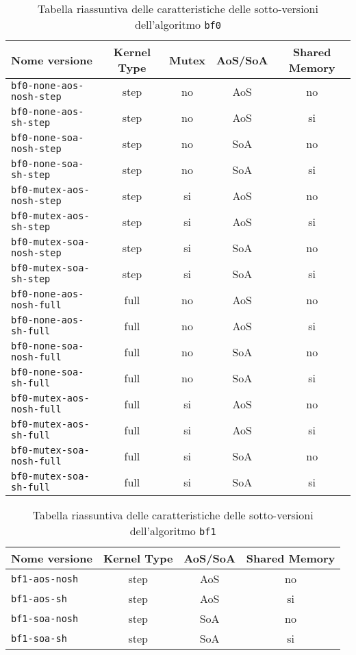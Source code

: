 \documentclass[a4paper]{article}
\begin{document}
	\begin{table}[!ht]
		\centering
		\begin{tabular}{|l|c|c|c|c|}
			\hline
			\textbf{Nome versione} & \textbf{Kernel Type} & \textbf{Mutex} & \textbf{AoS/SoA} & \textbf{Shared Memory} \\ \hline
			\texttt{bf0-none-aos-nosh-step}  & step & no & AoS & no \\ \hline
			\texttt{bf0-none-aos-sh-step}    & step & no & AoS & si \\ \hline
			\texttt{bf0-none-soa-nosh-step}  & step & no & SoA & no \\ \hline
			\texttt{bf0-none-soa-sh-step}    & step & no & SoA & si \\ \hline
			\texttt{bf0-mutex-aos-nosh-step} & step & si & AoS & no \\ \hline
			\texttt{bf0-mutex-aos-sh-step}   & step & si & AoS & si \\ \hline
			\texttt{bf0-mutex-soa-nosh-step} & step & si & SoA & no \\ \hline
			\texttt{bf0-mutex-soa-sh-step}   & step & si & SoA & si \\ \hline
			\texttt{bf0-none-aos-nosh-full}  & full & no & AoS & no \\ \hline
			\texttt{bf0-none-aos-sh-full}    & full & no & AoS & si \\ \hline
			\texttt{bf0-none-soa-nosh-full}  & full & no & SoA & no \\ \hline
			\texttt{bf0-none-soa-sh-full}    & full & no & SoA & si \\ \hline
			\texttt{bf0-mutex-aos-nosh-full} & full & si & AoS & no \\ \hline
			\texttt{bf0-mutex-aos-sh-full}   & full & si & AoS & si \\ \hline
			\texttt{bf0-mutex-soa-nosh-full} & full & si & SoA & no \\ \hline
			\texttt{bf0-mutex-soa-sh-full}   & full & si & SoA & si \\ \hline
		\end{tabular}
		\label{tab:riassunto_bf0}
		\caption{Tabella riassuntiva delle caratteristiche delle sotto-versioni dell'algoritmo \texttt{bf0}}
	\end{table}

	\begin{table}[!ht]
		\centering
		\begin{tabular}{|l|c|c|c|}
			\hline
			\textbf{Nome versione} & \textbf{Kernel Type} & \textbf{AoS/SoA} & \textbf{Shared Memory} \\ \hline
			\texttt{bf1-aos-nosh}  & step & AoS & no \\ \hline
			\texttt{bf1-aos-sh}    & step & AoS & si \\ \hline
			\texttt{bf1-soa-nosh}  & step & SoA & no \\ \hline
			\texttt{bf1-soa-sh}    & step & SoA & si \\ \hline
		\end{tabular}
		\label{tab:riassunto_bf1}
		\caption{Tabella riassuntiva delle caratteristiche delle sotto-versioni dell'algoritmo \texttt{bf1}}
	\end{table}
\end{document}
